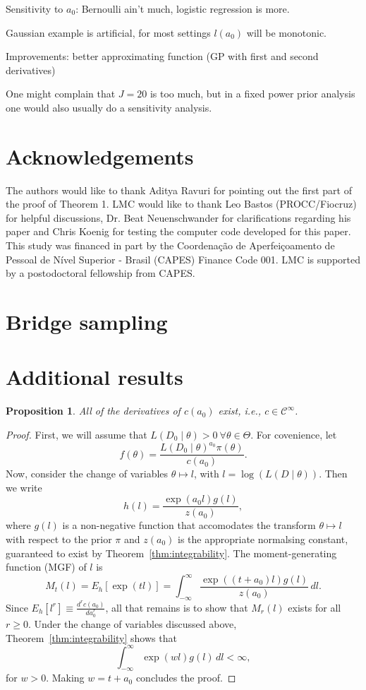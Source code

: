 \documentclass[a4paper, notitlepage, 11pt]{article}
\newtheorem{proposition}{Proposition}[]
\begin{document}
Sensitivity to $a_0$: Bernoulli ain't much, logistic regression is more.

Gaussian example is artificial, for most settings $l(a_0)$ will be monotonic. 

Improvements: better approximating function (GP with first and second derivatives)

One might complain that $J=20$ is too much, but in a fixed power prior analysis one would also usually do a sensitivity analysis.


\section*{Acknowledgements}

The authors would like to thank Aditya Ravuri for pointing out the first part of the proof of Theorem 1. 
LMC would like to thank Leo Bastos (PROCC/Fiocruz) for helpful discussions, Dr. Beat Neuenschwander for clarifications regarding his paper and Chris Koenig for testing the computer code developed for this paper.
This study was financed in part by the Coordenação de Aperfeiçoamento de Pessoal de Nível Superior - Brasil (CAPES) Finance Code 001.
LMC is supported by a postodoctoral fellowship from CAPES.



\appendix

\section{Bridge sampling}

\section{Additional results}
\label{sec:further_proofs}

\begin{proposition}
\label{prop:c_is_Cinfinity}
All of the derivatives of $c(a_0)$ exist, i.e., $c \in \mathcal{C}^{\infty}$.
\end{proposition}
\begin{proof}
First, we will assume that $L(D_0 \mid \theta) > 0\: \forall \theta \in \Theta$.
For covenience, let
\[  f(\theta) = \frac{L(D_0 \mid \theta)^{a_0} \pi(\theta)}{c(a_0)}. \]
Now, consider the change of variables $\theta \mapsto l$, with $l = \log(L(D \mid \theta))$.
Then we write
\[ h (l) = \frac{\exp(a_0 l) g(l)}{z(a_0)},\]
where $g(l)$ is a non-negative function that accomodates the transform $\theta \mapsto l$ with respect to the prior $\pi$ and $z(a_0)$ is the appropriate normalsing constant, guaranteed to exist by Theorem~\ref{thm:integrability}.
The moment-generating function (MGF) of $l$ is 
\[ M_t(l) = E_h[\exp(tl)] = \int_{-\infty}^\infty \frac{\exp((t + a_0) l) g(l)}{z(a_0)}\, dl.\]
Since $E_h[l^r] \equiv  \frac{d^r c(a_0)}{d a_0^r}$, all that remains is to show that $M_r(l)$ exists for all $r \geq 0$.
Under the change of variables discussed above, Theorem~\ref{thm:integrability} shows that
\[ \int_{-\infty}^\infty \exp(wl) g(l)\, dl < \infty,\]
for $w > 0$.
Making $w = t + a_0$ concludes the proof.
\end{proof}
\end{document}
